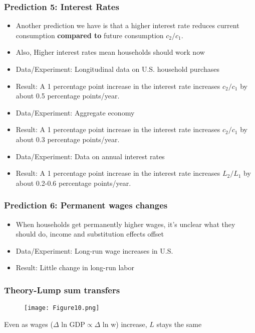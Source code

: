 \documentclass{beamer}
\begin{document}
\begin{frame}
\frametitle{Prediction 5: Interest Rates}
\begin{itemize}
\item Another prediction we have is that a higher interest rate reduces current consumption \textbf{compared to} future consumption $c_2/c_1$.  
\item Also, Higher interest rates mean households should work now
\bigskip
\item Data/Experiment:  Longitudinal data on U.S. household purchases
\bigskip
\item Result:  A 1 percentage point increase in the interest rate increases $c_2/c_1$ by about 0.5 percentage points/year.
\bigskip
\item Data/Experiment:  Aggregate economy
\bigskip
\item Result:  A 1 percentage point increase in the interest rate increases $c_2/c_1$ by about 0.3 percentage points/year.
\bigskip
\item Data/Experiment:  Data on annual interest rates
\bigskip
\item Result:  A 1 percentage point increase in the interest rate increases $L_2/L_1$ by about 0.2-0.6 percentage points/year.
\end{itemize}
\end{frame}


\begin{frame}
\frametitle{Prediction 6: Permanent wages changes}
\begin{itemize}
\item When households get permanently higher wages, it's unclear what they should do, income and substitution effects offset  
\bigskip
\item Data/Experiment:  Long-run wage increases in U.S.
\bigskip
\item Result:  Little change in long-run labor
\end{itemize}
\end{frame}

\begin{frame}
\frametitle{Theory-Lump sum transfers }
\begin{figure}
\centering
\texttt{[image: Figure10.png]}
\end{figure}
Even as wages ($\Delta$ ln GDP$\propto \Delta$ ln w) increase, $L$ stays the same
\end{frame}
\end{document}
